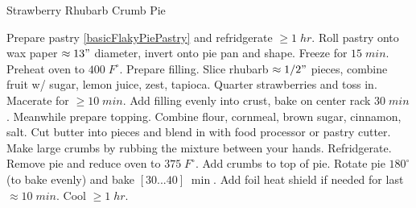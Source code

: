 \begin{recipe}[
preparationtime = 1 hour 30 minutes,
source = \citefield{pie2004}{title} \cite{pie2004},
]
{Strawberry Rhubarb Crumb Pie}



\preparation
{
\step Prepare pastry \ref{basicFlakyPiePastry} and refridgerate $\geq 1\; hr$.  %
\step Roll pastry onto wax paper $\approx 13"$ diameter, invert onto pie pan and shape. Freeze for $15 \; min$. Preheat oven to $400 \; F^\circ$.
\step Prepare filling. Slice rhubarb $\approx 1/2"$ pieces, combine fruit w/ sugar, lemon juice, zest, tapioca. Quarter strawberries and toss in. Macerate for $\geq 10 \; min$.
\step Add filling evenly into crust, bake on center rack $30 \; min$.
\step Meanwhile prepare topping. Combine flour, cornmeal, brown sugar, cinnamon, salt. Cut butter into pieces and blend in with food processor or pastry cutter. Make large crumbs by rubbing the mixture between your hands. Refridgerate.
\step Remove pie and reduce oven to $375 \; F^\circ$. Add crumbs to top of pie. Rotate pie $180^\circ$ (to bake evenly) and bake $[30...40] \; \min$. Add foil heat shield if needed for last $\approx 10 \; min$. Cool $\geq 1\; hr$.
}


\end{recipe}

